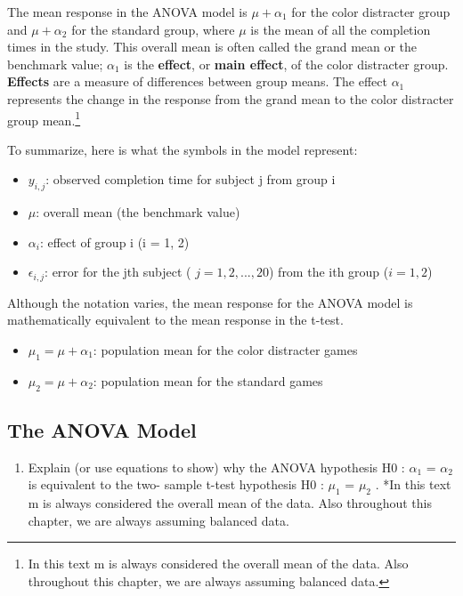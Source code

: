 \documentclass[
]{report}
\providecommand{\tightlist}{%
  \setlength{\itemsep}{0pt}\setlength{\parskip}{0pt}}
\begin{document}
The mean response in the ANOVA model is \(\mu + \alpha_1\) for the color distracter group and \(\mu + \alpha_2\) for the standard group, where \(\mu\) is the mean of all the completion times in the study. This overall mean is often called the grand mean or the benchmark value; \(\alpha_1\) is the \textbf{effect}, or \textbf{main effect}, of the color distracter group. \textbf{Effects} are a measure of differences between group means. The effect \(\alpha_1\) represents the change in the response from the grand mean to the color distracter group mean.\footnote{In this text m is always considered the overall mean of the data. Also throughout this chapter, we are always assuming balanced data.}

To summarize, here is what the symbols in the model represent:

\begin{itemize}
\tightlist
\item
  \(y_{i,j}\): observed completion time for subject j from group i
\item
  \(\mu\): overall mean (the benchmark value)
\item
  \(\alpha_i\): effect of group i (i = 1, 2)
\item
  \(\epsilon_{i,j}\): error for the jth subject ( \(j = 1, 2, ... , 20\)) from the ith group (\(i = 1, 2\))
\end{itemize}

Although the notation varies, the mean response for the ANOVA model is mathematically equivalent to the mean response in the t-test.

\begin{itemize}
\tightlist
\item
  \(\mu_1 = \mu + \alpha_1\): population mean for the color distracter games
\item
  \(\mu_2 = \mu + \alpha_2\): population mean for the standard games
\end{itemize}

\hypertarget{the-anova-model-1}{%
\subsection*{The ANOVA Model}\label{the-anova-model-1}}

\begin{enumerate}
\def\labelenumi{\arabic{enumi}.}
\setcounter{enumi}{15}
\tightlist
\item
  Explain (or use equations to show) why the ANOVA hypothesis H0 : \(\alpha_1\) = \(\alpha_2\) is equivalent to the two- sample t-test hypothesis H0 : \(\mu_1\) = \(\mu_2\) .
  *In this text m is always considered the overall mean of the data. Also throughout this chapter, we are always assuming balanced data.
\end{enumerate}
\end{document}
